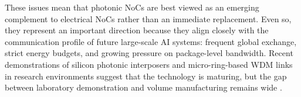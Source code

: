 These issues mean that photonic NoCs are best viewed as an emerging complement to electrical NoCs rather than an immediate replacement. Even so, they represent an important direction because they align closely with the communication profile of future large-scale AI systems: frequent global exchange, strict energy budgets, and growing pressure on package-level bandwidth. Recent demonstrations of silicon photonic interposers and micro-ring-based WDM links in research environments suggest that the technology is maturing, but the gap between laboratory demonstration and volume manufacturing remains wide \cite{pasricha2022electronic,weerasena2024security}.
